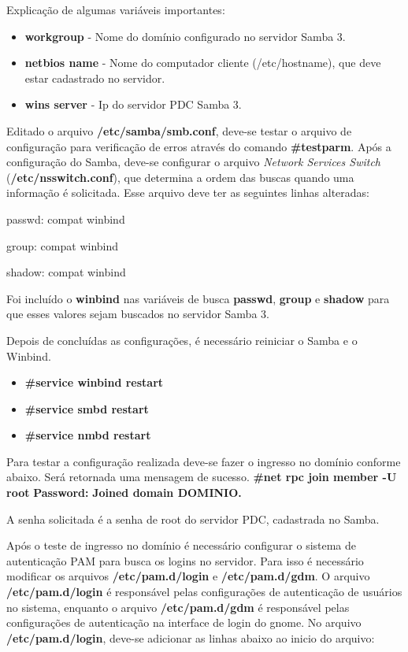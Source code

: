 Explicação de algumas variáveis importantes:
\begin{itemize}
	\item \textbf{workgroup} - Nome do domínio configurado no servidor Samba 3.
	\item \textbf{netbios name} - Nome do computador cliente (/etc/hostname), que deve estar cadastrado no servidor.
	\item \textbf{wins server} - Ip do servidor PDC Samba 3.
\end{itemize}

Editado o arquivo \textbf{/etc/samba/smb.conf}, deve-se testar o arquivo de configuração para verificação de erros através do comando \textbf{\#testparm}.
Após a configuração do Samba, deve-se configurar o arquivo \textit{Network Services Switch} (\textbf{/etc/nsswitch.conf}), que determina a ordem das buscas quando uma informação é solicitada. Esse arquivo deve ter as seguintes linhas alteradas:

  passwd: compat winbind

  group: compat winbind

  shadow: compat winbind

Foi incluído o \textbf{winbind} nas variáveis de busca \textbf{passwd}, \textbf{group} e \textbf{shadow} para que esses valores sejam buscados no servidor Samba 3.

Depois de concluídas as configurações, é necessário reiniciar o Samba e o Winbind.
\begin{itemize}
	\item \textbf{\#service winbind restart}
	\item \textbf{\#service smbd restart}
	\item \textbf{\#service nmbd restart}
\end{itemize}

Para testar a configuração realizada deve-se fazer o ingresso no domínio conforme abaixo. Será retornada uma mensagem de sucesso.
\textbf{\#net rpc join member -U root}
\textbf{Password:}
\textbf{Joined domain DOMINIO.}

A senha solicitada é a senha de root do servidor PDC, cadastrada no Samba.

Após o teste de ingresso no domínio é necessário configurar o sistema de autenticação PAM para busca os logins no servidor. Para isso é necessário modificar os arquivos \textbf{/etc/pam.d/login} e \textbf{/etc/pam.d/gdm}. O arquivo \textbf{/etc/pam.d/login} é responsável pelas configurações de autenticação de usuários no sistema, enquanto o arquivo \textbf{/etc/pam.d/gdm} é responsável pelas configurações de autenticação na interface de login do gnome.
No arquivo \textbf{/etc/pam.d/login}, deve-se adicionar as linhas abaixo ao inicio do arquivo:

